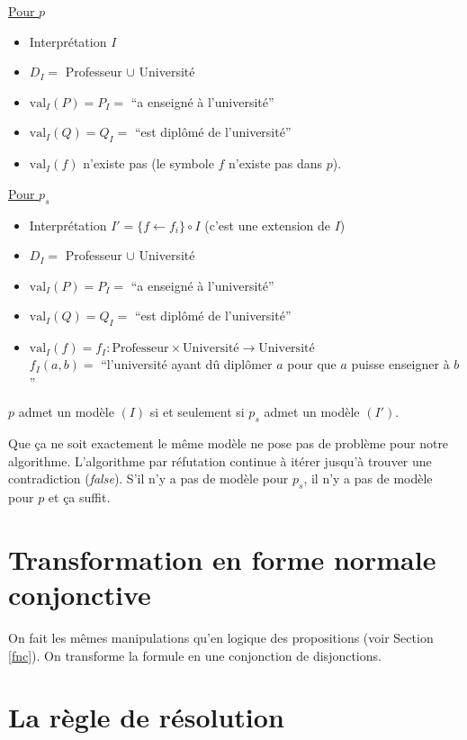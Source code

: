 {\underline{Pour $p$}
\begin{itemize}
  \item Interprétation $I$
  \item $D_I =$ Professeur $\cup$ Université
  \item $\mathrm{val}_I(P) = P_I = $ ``a enseigné à l'université''
  \item $\mathrm{val}_I(Q) = Q_I = $ ``est diplômé de l'université''
  \item $\mathrm{val}_I(f)$ n'existe pas (le symbole $f$ n'existe pas dans $p$).
\end{itemize}

\vspace{\baselineskip}

\underline{Pour $p_s$}
\begin{itemize}
  \item Interprétation $I' = \{ f \leftarrow f_i \} \circ I$ (c'est une extension de $I$)
  \item $D_I =$ Professeur $\cup$ Université
  \item $\mathrm{val}_I(P) = P_I = $ ``a enseigné à l'université''
  \item $\mathrm{val}_I(Q) = Q_I = $ ``est diplômé de l'université''
  \item $\mathrm{val}_I(f) = f_I : \mathrm{Professeur} \times \mathrm{Université} \rightarrow \mathrm{Université}$ \\
  $f_I(a,b) = $ ``l'université ayant dû diplômer $a$ pour que $a$ puisse enseigner à $b$''
\end{itemize}

$p$ admet un modèle $(I)$ si et seulement si $p_s$ admet un modèle $(I')$.

Que ça ne soit exactement le même modèle ne pose pas de problème pour notre algorithme. L'algorithme par réfutation continue à itérer jusqu'à trouver une contradiction ({\em false}). S'il n'y a pas de modèle pour $p_s$, il n'y a pas de modèle pour $p$ et ça suffit.

\section{Transformation en forme normale conjonctive}

On fait les
mêmes manipulations qu'en logique des propositions (voir Section \ref{fnc}).
On transforme la formule en une conjonction de disjonctions.

\section{La règle de résolution}

}
